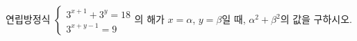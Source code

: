 연립방정식 $\begin{cases} 3^{x+1}+3^y=18 \\ 3^{x+y-1}=9 \end{cases}$의 해가 $x=\alpha$, $y=\beta$일 때, $\alpha^2+\beta^2$의 값을 구하시오.
